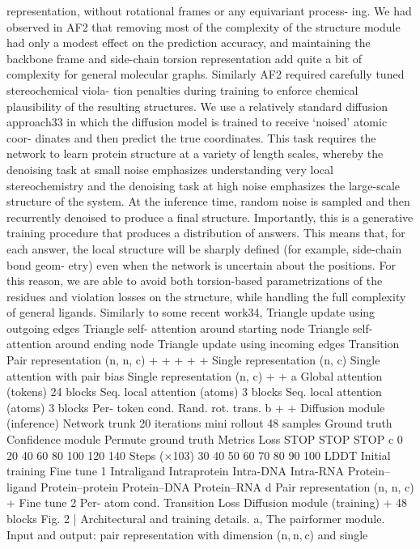 representation, without rotational frames or any equivariant process-
ing. We had observed in AF2 that removing most of the complexity
of the structure module had only a modest effect on the prediction
accuracy, and maintaining the backbone frame and side-chain torsion
representation add quite a bit of complexity for general molecular
graphs. Similarly AF2 required carefully tuned stereochemical viola-
tion penalties during training to enforce chemical plausibility of the
resulting structures. We use a relatively standard diffusion approach33
in which the diffusion model is trained to receive ‘noised’ atomic coor-
dinates and then predict the true coordinates. This task requires the
network to learn protein structure at a variety of length scales, whereby
the denoising task at small noise emphasizes understanding very local
stereochemistry and the denoising task at high noise emphasizes the
large-scale structure of the system. At the inference time, random noise
is sampled and then recurrently denoised to produce a final structure.
Importantly, this is a generative training procedure that produces a
distribution of answers. This means that, for each answer, the local
structure will be sharply defined (for example, side-chain bond geom-
etry) even when the network is uncertain about the positions. For this
reason, we are able to avoid both torsion-based parametrizations of
the residues and violation losses on the structure, while handling the
full complexity of general ligands. Similarly to some recent work34,
Triangle
update
using
outgoing
edges
Triangle
self-
attention
around
starting
node
Triangle
self-
attention
around
ending
node
Triangle
update
using
incoming
edges
Transition
Pair representation
(n, n, c)
+
+
+
+
+
Single
representation (n, c)
Single
attention
with pair
bias
Single
representation (n, c)
+
+
a
Global attention
(tokens)
24 blocks
Seq. local
attention
(atoms)
3 blocks
Seq. local
attention
(atoms)
3 blocks
Per-
token
cond.
Rand.
rot.
trans.
b
+
+
Diffusion
module
(inference)
Network
trunk
20 iterations
mini rollout
48 samples
Ground
truth
Conﬁdence
module
Permute
ground
truth
Metrics
Loss
STOP
STOP
STOP
c
0
20
40
60
80
100
120
140
Steps (×103)
30
40
50
60
70
80
90
100
LDDT
Initial training
Fine
tune 1
 Intraligand
 Intraprotein
 Intra-DNA
 Intra-RNA
 Protein–ligand
 Protein–protein
 Protein–DNA
 Protein–RNA
d
Pair representation
(n, n, c)
+
Fine
tune 2
Per-
atom
cond.
Transition
Loss
Diffusion
module
(training)
+
48 blocks
Fig. 2 | Architectural and training details. a, The pairformer module.
Input and output: pair representation with dimension (n, n, c) and single
